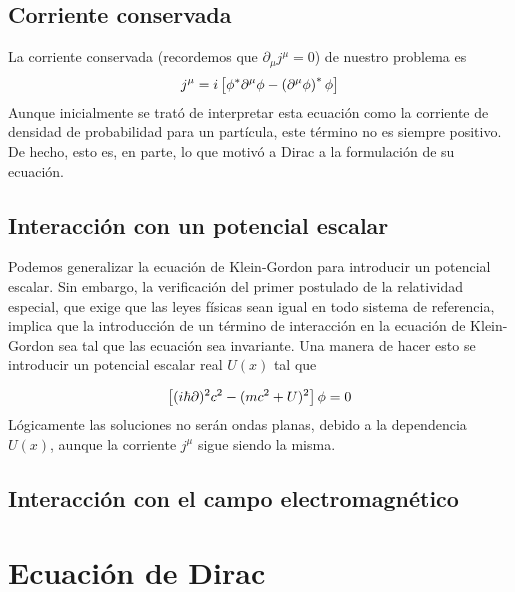 \subsection{Corriente conservada}

La corriente conservada (recordemos que $\partial_\mu j^\mu = 0$) de nuestro problema es
\begin{equation}
	j^\mu = i \left[ \phi^* \partial^\mu \phi - \left( \partial^\mu \phi \right)^* \phi \right]
\end{equation}
Aunque inicialmente se trató de interpretar esta ecuación como la corriente de densidad de probabilidad para un partícula, este término no es siempre positivo. De hecho, esto es, en parte, lo que motivó a Dirac a la formulación de su ecuación. 

\subsection{Interacción con un potencial escalar}

Podemos generalizar la ecuación de Klein-Gordon para introducir un potencial escalar. Sin embargo, la verificación del primer postulado de la relatividad especial, que exige que las leyes físicas sean igual en todo sistema de referencia, implica que la introducción de un término de interacción en la ecuación de Klein-Gordon sea tal que las ecuación sea invariante. Una manera de hacer esto se introducir un potencial escalar real $U(x)$ tal que

\begin{equation}
	\left[ (i\hbar\partial)^2c^2 - (mc^2+U)^2 \right] \phi=0
\end{equation}
Lógicamente las soluciones no serán ondas planas, debido a la dependencia $U(x)$, aunque la corriente $j^\mu$ sigue siendo la misma.


\subsection{Interacción con el campo electromagnético}





\section{Ecuación de Dirac}


